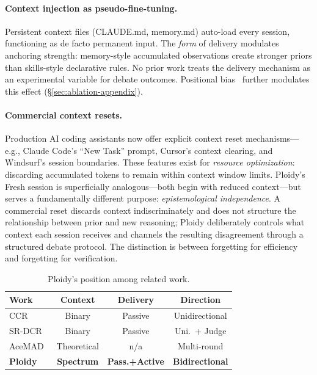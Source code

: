 \documentclass{article}
\begin{document}
\paragraph{Context injection as pseudo-fine-tuning.} Persistent context files (CLAUDE.md, memory.md) auto-load every session, functioning as de facto permanent input. The \emph{form} of delivery modulates anchoring strength: memory-style accumulated observations create stronger priors than skills-style declarative rules. No prior work treats the delivery mechanism as an experimental variable for debate outcomes. Positional bias~\citep{liu2023lost} further modulates this effect (\S\ref{sec:ablation-appendix}).

\paragraph{Commercial context resets.} Production AI coding assistants now offer explicit context reset mechanisms---e.g., Claude Code's ``New Task'' prompt, Cursor's context clearing, and Windsurf's session boundaries. These features exist for \emph{resource optimization}: discarding accumulated tokens to remain within context window limits. Ploidy's Fresh session is superficially analogous---both begin with reduced context---but serves a fundamentally different purpose: \emph{epistemological independence}. A commercial reset discards context indiscriminately and does not structure the relationship between prior and new reasoning; Ploidy deliberately controls what context each session receives and channels the resulting disagreement through a structured debate protocol. The distinction is between forgetting for efficiency and forgetting for verification.

\begin{table}[t]
\centering
\caption{Ploidy's position among related work.}
\label{tab:prior-work}
\footnotesize
\setlength{\tabcolsep}{3pt}
\begin{tabular}{@{}lccc@{}}
\toprule
\textbf{Work} & \textbf{Context} & \textbf{Delivery} & \textbf{Direction} \\
\midrule
CCR~\citep{song2026ccr} & Binary & Passive & Unidirectional \\
SR-DCR~\citep{srdcr2025} & Binary & Passive & Uni.\ + Judge \\
AceMAD~\citep{liu2026acemad} & Theoretical & n/a & Multi-round \\
\textbf{Ploidy} & \textbf{Spectrum} & \textbf{Pass.+Active} & \textbf{Bidirectional} \\
\bottomrule
\end{tabular}
\end{table}
\end{document}

